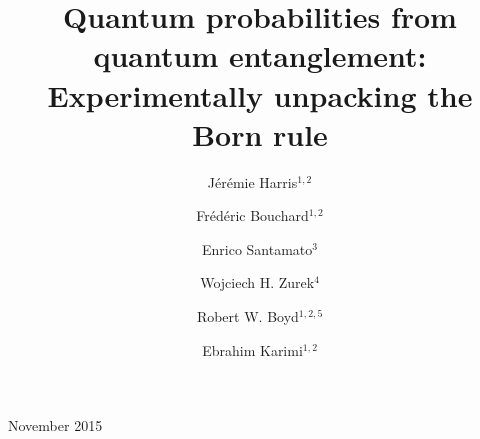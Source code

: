 \documentclass[12pt]{iopart}
\begin{document}
%
\title[Quantum probabilities from quantum entanglement]{Quantum probabilities from quantum entanglement: Experimentally unpacking the Born rule}
%
\author{J\'er\'emie Harris$^{1,2}$}
\address{$^1$Department of Physics, University of Ottawa, 25 Templeton, Ottawa, Ontario, K1N 6N5 Canada}
\address{$^2$The Max Planck Centre for Extreme and Quantum Photonics, University of Ottawa, Ottawa, Ontario, K1N 6N5, Canada}

\author{Fr\'ed\'eric Bouchard$^{1,2}$}
\address{$^1$Department of Physics, University of Ottawa, 25 Templeton, Ottawa, Ontario, K1N 6N5 Canada}
\address{$^2$The Max Planck Centre for Extreme and Quantum Photonics, University of Ottawa, Ottawa, Ontario, K1N 6N5, Canada}

\author{Enrico Santamato$^{3}$}
\address{$^3$Dipartimento di Fisica, Universit\`a di Napoli Federico II, Compl. Univ. di Monte S. Angelo, via Cintia, 80126 Napoli, Italy}

\author{Wojciech H. Zurek$^{4}$}
\address{$^4$Theoretical Division, Los Alamos National Laboratory, Los Alamos, NM 87545, USA}

\author{Robert W. Boyd$^{1,2,5}$}
\address{$^1$Department of Physics, University of Ottawa, 25 Templeton, Ottawa, Ontario, K1N 6N5 Canada}
\address{$^2$The Max Planck Centre for Extreme and Quantum Photonics, University of Ottawa, Ottawa, Ontario, K1N 6N5, Canada}
\address{$^5$Institute of Optics, University of Rochester, Rochester, New York, 14627, USA}

\author[cor1]{Ebrahim Karimi$^{1,2}$}
\address{$^1$Department of Physics, University of Ottawa, 25 Templeton, Ottawa, Ontario, K1N 6N5 Canada}
\address{$^2$The Max Planck Centre for Extreme and Quantum Photonics, University of Ottawa, Ottawa, Ontario, K1N 6N5, Canada}


%
\begin{indented}
\item[]November 2015
\end{indented}
\end{document}
